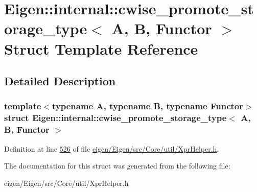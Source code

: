 \hypertarget{struct_eigen_1_1internal_1_1cwise__promote__storage__type}{}\section{Eigen\+:\+:internal\+:\+:cwise\+\_\+promote\+\_\+storage\+\_\+type$<$ A, B, Functor $>$ Struct Template Reference}
\label{struct_eigen_1_1internal_1_1cwise__promote__storage__type}


\subsection{Detailed Description}
\subsubsection*{template$<$typename A, typename B, typename Functor$>$\newline
struct Eigen\+::internal\+::cwise\+\_\+promote\+\_\+storage\+\_\+type$<$ A, B, Functor $>$}



Definition at line \hyperlink{eigen_2_eigen_2src_2_core_2util_2_xpr_helper_8h_source_l00526}{526} of file \hyperlink{eigen_2_eigen_2src_2_core_2util_2_xpr_helper_8h_source}{eigen/\+Eigen/src/\+Core/util/\+Xpr\+Helper.\+h}.



The documentation for this struct was generated from the following file\+:\begin{DoxyCompactItemize}
\item 
eigen/\+Eigen/src/\+Core/util/\+Xpr\+Helper.\+h\end{DoxyCompactItemize}
